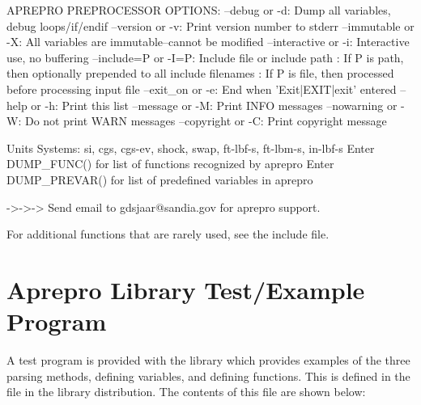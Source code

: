 \begin{apout}
APREPRO PREPROCESSOR OPTIONS:
        --debug or -d: Dump all variables, debug loops/if/endif
      --version or -v: Print version number to stderr          
    --immutable or -X: All variables are immutable--cannot be modified
  --interactive or -i: Interactive use, no buffering           
  --include=P or -I=P: Include file or include path            
                     : If P is path, then optionally prepended to all include filenames
                     : If P is file, then processed before processing input file
      --exit\_on or -e: End when 'Exit|EXIT|exit' entered       
         --help or -h: Print this list                         
      --message or -M: Print INFO messages                     
    --nowarning or -W: Do not print WARN messages              
    --copyright or -C: Print copyright message                 

   Units Systems: si, cgs, cgs-ev, shock, swap, ft-lbf-s, ft-lbm-s, in-lbf-s
   Enter {DUMP\_FUNC()} for list of functions recognized by aprepro
   Enter {DUMP\_PREVAR()} for list of predefined variables in aprepro

   ->->-> Send email to gdsjaar@sandia.gov for aprepro support.
\end{apout}

For additional functions that are rarely used, see the
 include file.

\section{Aprepro Library Test/Example Program}
A test program is provided with the \aprepro{} library which provides
examples of the three parsing methods, defining variables, and
defining functions.  This is defined in the  file in
the \aprepro{} library distribution. The contents of this file are
shown below:



